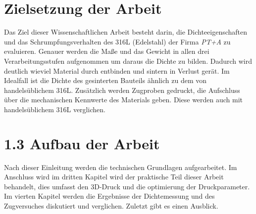 \section{Zielsetzung der Arbeit}

Das Ziel dieser Wissenschaftlichen Arbeit besteht darin, die Dichteeigenschaften und das Schrumpfungsverhalten des 316L (Edelstahl) der Firma \textit{PT+A} zu evaluieren. 
Genauer werden die Maße und das Gewicht in allen drei Verarbeitungsstufen aufgenommen um daraus die Dichte zu bilden. Dadurch wird deutlich wieviel Material durch entbinden und sintern in Verlust gerät.
Im Idealfall ist die Dichte des gesinterten Bauteils ähnlich zu dem von handelsüblichem 316L.
Zusätzlich werden Zugproben gedruckt, die Aufschluss über die mechanischen Kennwerte des Materials geben. Diese werden auch mit handelsüblichem 316L verglichen.
    
\section{1.3 Aufbau der Arbeit}

Nach dieser Einleitung werden die technischen Grundlagen aufgearbeitet. Im Anschluss wird im dritten Kapitel wird der praktische Teil dieser Arbeit behandelt, dies umfasst den 3D-Druck und die optimierung der Druckparameter. Im vierten Kapitel werden die Ergebnisse der Dichtemessung und des Zugversuches diskutiert und verglichen. Zuletzt gibt es einen Ausblick.

